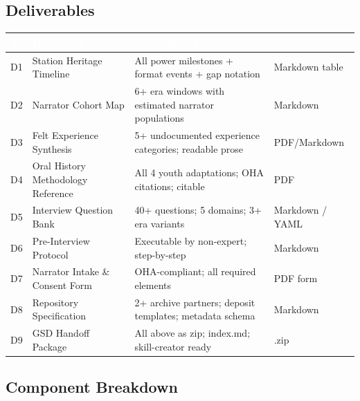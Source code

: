 \documentclass[11pt,letterpaper]{article}
\newcommand{\tableheader}[1]{\textbf{\sffamily\textcolor{white}{#1}}}
\begin{document}
\subsection{Deliverables}

\begin{center}
\begin{tabularx}{\textwidth}{C{0.8cm}L{4cm}L{3.5cm}L{3cm}}
\toprule
{}
\tableheader{\#} & \tableheader{Deliverable} & \tableheader{Acceptance Criteria} & \tableheader{Spec} \\
\midrule
D1 & Station Heritage Timeline & All power milestones + format events + gap notation & Markdown table \\
D2 & Narrator Cohort Map & 6+ era windows with estimated narrator populations & Markdown \\
D3 & Felt Experience Synthesis & 5+ undocumented experience categories; readable prose & PDF/Markdown \\
D4 & Oral History Methodology Reference & All 4 youth adaptations; OHA citations; citable & PDF \\
D5 & Interview Question Bank & 40+ questions; 5 domains; 3+ era variants & Markdown / YAML \\
D6 & Pre-Interview Protocol & Executable by non-expert; step-by-step & Markdown \\
D7 & Narrator Intake \& Consent Form & OHA-compliant; all required elements & PDF form \\
D8 & Repository Specification & 2+ archive partners; deposit templates; metadata schema & Markdown \\
D9 & GSD Handoff Package & All above as zip; index.md; skill-creator ready & .zip \\
\bottomrule
\end{tabularx}
\end{center}

\subsection{Component Breakdown}
\end{document}
